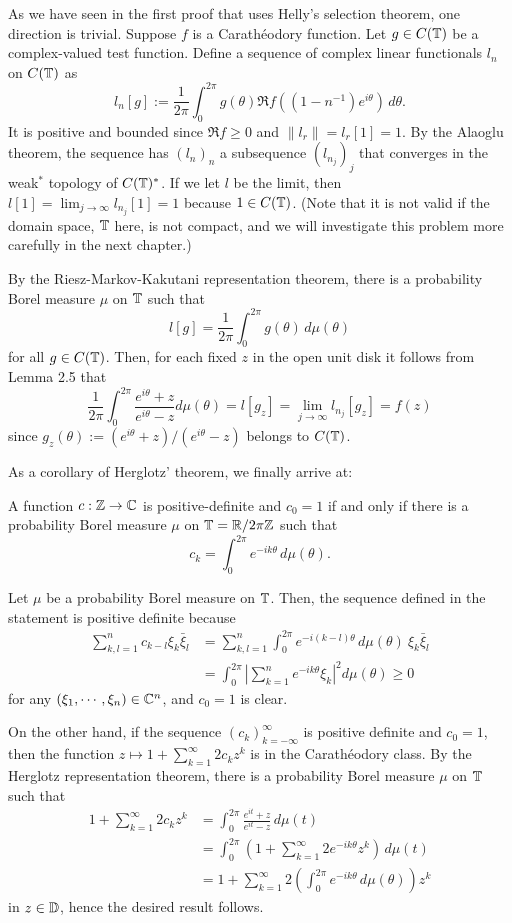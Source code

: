 \documentclass[a4paper]{article}
\begin{document}
\begin{pf}
As we have seen in the first proof that uses Helly's selection theorem, one direction is trivial.
Suppose $f$ is a Carath\'eodory function.
Let $g\in C(\mathbb{T})$ be a complex-valued test function.
Define a sequence of complex linear functionals $l_n$ on $C(\mathbb{T})$ as
\[l_n[g]:=\frac1{2\pi}\int_0^{2\pi}g(\theta)\Re f((1-n^{-1})e^{i\theta})\,d\theta.\]
It is positive and bounded since $\Re f\ge0$ and $\|l_r\|=l_r[1]=1$.
By the Alaoglu theorem, the sequence has $(l_n)_n$ a subsequence $(l_{n_j})_j$ that converges in the weak$^*$ topology of $C(\mathbb{T})^*$.
If we let $l$ be the limit, then $l[1]=\lim_{j\to\infty}l_{n_j}[1]=1$ because $1\in C(\mathbb{T})$.
(Note that it is not valid if the domain space, $\mathbb{T}$ here, is not compact, and we will investigate this problem more carefully in the next chapter.)

By the Riesz-Markov-Kakutani representation theorem, there is a probability Borel measure $\mu$ on $\mathbb{T}$ such that
\[l[g]=\frac1{2\pi}\int_0^{2\pi}g(\theta)\,d\mu(\theta)\]
for all $g\in C(\mathbb{T})$.
Then, for each fixed $z$ in the open unit disk it follows from Lemma 2.5 that
\[\frac1{2\pi}\int_0^{2\pi}\frac{e^{i\theta}+z}{e^{i\theta}-z}d\mu(\theta)=l[g_z]=\lim_{j\to\infty}l_{n_j}[g_z]=f(z)\]
since $g_z(\theta):=(e^{i\theta}+z)/(e^{i\theta}-z)$ belongs to $C(\mathbb{T})$.
\end{pf}

As a corollary of Herglotz' theorem, we finally arrive at:

\begin{cor}
A function $c:\mathbb{Z}\to\mathbb{C}$ is positive-definite and $c_0=1$ if and only if there is a probability Borel measure $\mu$ on $\mathbb{T}=\mathbb{R}/2\pi\mathbb{Z}$ such that
\[c_k=\int_0^{2\pi}e^{-ik\theta}\,d\mu(\theta).\]
\end{cor}
\begin{pf}
Let $\mu$ be a probability Borel measure on $\mathbb{T}$.
Then, the sequence defined in the statement is positive definite because
\begin{align*}
\sum_{k,l=1}^nc_{k-l}\xi_k\bar\xi_l
&=\sum_{k,l=1}^n\int_0^{2\pi}e^{-i(k-l)\theta}\,d\mu(\theta)\ \xi_k\bar\xi_l\\
&=\int_0^{2\pi}\left|\sum_{k=1}^ne^{-ik\theta}\xi_k\right|^2d\mu(\theta)\ge0
\end{align*}
for any $(\xi_1,\cdots,\xi_n)\in\mathbb{C}^n$, and $c_0=1$ is clear.

On the other hand, if the sequence $(c_k)_{k=-\infty}^\infty$ is positive definite and $c_0=1$, then the function $z\mapsto1+\sum_{k=1}^\infty2c_kz^k$ is in the Carath\'eodory class.
By the Herglotz representation theorem, there is a probability Borel measure $\mu$ on $\mathbb{T}$ such that
\begin{align*}
1+\sum_{k=1}^\infty2c_kz^k
&=\int_0^{2\pi}\frac{e^{it}+z}{e^{it}-z}\,d\mu(t)\\
&=\int_0^{2\pi}\left(1+\sum_{k=1}^\infty2e^{-ik\theta}z^k\right)\,d\mu(t)\\
&=1+\sum_{k=1}^\infty2\left(\int_0^{2\pi}e^{-ik\theta}\,d\mu(\theta)\right)z^k
\end{align*}
in $z\in\mathbb{D}$, hence the desired result follows.
\end{pf}
\end{document}
